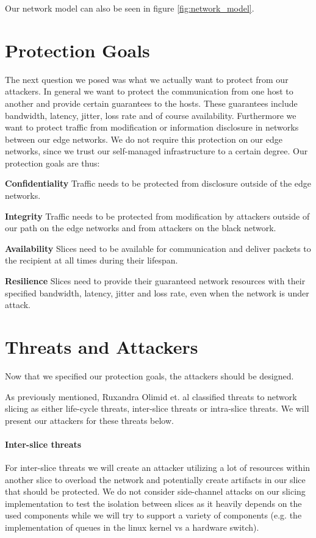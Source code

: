 Our network model can also be seen in figure \ref{fig:network_model}.

\section{Protection Goals}
\label{protection_goals}
The next question we posed was what we actually want to protect from our attackers. In general we want to protect the communication from one host to another and provide certain guarantees to the hosts. These guarantees include bandwidth, latency, jitter, loss rate and of course availability. Furthermore we want to protect traffic from modification or information disclosure in networks between our edge networks. We do not require this protection on our edge networks, since we trust our self-managed infrastructure to a certain degree. Our protection goals are thus:
\begin{description}[style=multiline, labelwidth=0.7cm]
    \item[\namedlabel{P1}{P1}] \textbf{Confidentiality} Traffic needs to be protected from disclosure outside of the edge networks.
    \item[\namedlabel{P2}{P2}] \textbf{Integrity} Traffic needs to be protected from modification by attackers outside of our path on the edge networks and from attackers on the black network.
    \item[\namedlabel{P3}{P3}] \textbf{Availability} Slices need to be available for communication and deliver packets to the recipient at all times during their lifespan.
    \item[\namedlabel{P4}{P4}] \textbf{Resilience} Slices need to provide their guaranteed network resources with their specified bandwidth, latency, jitter and loss rate, even when the network is under attack.
\end{description}

\section{Threats and Attackers}
\label{adversaries}
Now that we specified our protection goals, the attackers should be designed.

As previously mentioned, Ruxandra Olimid et. al \cite{SE2} classified threats to network slicing as either life-cycle threats, inter-slice threats or intra-slice threats. We will present our attackers for these threats below.

\paragraph{Inter-slice threats} For inter-slice threats we will create an attacker utilizing a lot of resources within another slice to overload the network and potentially create artifacts in our slice that should be protected. We do not consider side-channel attacks on our slicing implementation to test the isolation between slices as it heavily depends on the used components while we will try to support a variety of components (e.g. the implementation of queues in the linux kernel vs a hardware switch).

